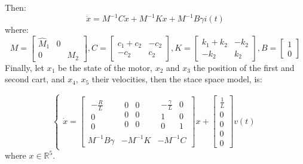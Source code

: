 Then:
\begin{equation}\ddot{x} = M^{-1}C\dot{x}+M^{-1}Kx+ M^{-1}B\gamma i(t)\end{equation}
where:
\begin{equation}M=\begin{bmatrix}
\hat{M}_1 & 0 \\
0 && M_2
\end{bmatrix}, C=\begin{bmatrix}
c_1+c_2 & -c_2 \\
-c_2 & c_2
\end{bmatrix}, K=\begin{bmatrix}
k_1+k_2 & -k_2 \\
-k_2 & k_2
\end{bmatrix}, B=\begin{bmatrix}1\\ 0 \end{bmatrix}\end{equation}
Finally, let $x_1$ be the state of the motor, $x_2$ and $x_3$ the position of the first and second cart, and $x_4$, $x_5$ their velocities, then the stace space model, is:

\begin{equation}
\begin{cases}
\dot{x}=
\left[ \begin{array} { c|c|c  } 
                \begin{array}{c} 
               -\frac{R}{L} \\ 
                0 \\
                0 
                \end{array} &
                \begin{array}{cc} 
               0 & 0 \\ 
                0 & 0 \\
                0  & 0 
                \end{array}&
                \begin{array}{cc} 
               -\frac{\gamma}{L} & 0 \\ 
                1 & 0 \\
                0  & 1 
                \end{array} \\
                \hline 
                M^{-1}B\gamma& -M^{-1}K & -M^{-1}C
\end{array} \right] 
x+\begin{bmatrix}\frac{1}{L} \\ 0 \\ 0 \\ 0 \\ 0\end{bmatrix}v(t)
\end{cases}
\end{equation}
where $x \in \mathbb{R}^5$.

